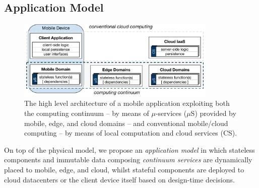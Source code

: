 




\subsection{Application Model}\label{sec:application_model}

\begin{figure}[tbp]
	\includegraphics[width=0.85\textwidth]{figs/Continuum-arch}
	\caption{The high level architecture of a mobile application exploiting both the computing continuum -- by means of $\mu$-services ($\mu$S) provided by mobile, edge, and cloud domains -- and conventional mobile/cloud computing -- by means of local computation and cloud services (CS).}
	\label{fig:Continuum-arch}
\end{figure}

On top of the physical model, we propose an \textit{application model} in which stateless components and immutable data composing \textit{continuum services} are dynamically placed to mobile, edge, and cloud,
whilst 
stateful components are deployed to cloud datacenters or the client device itself based on design-time decisions.

